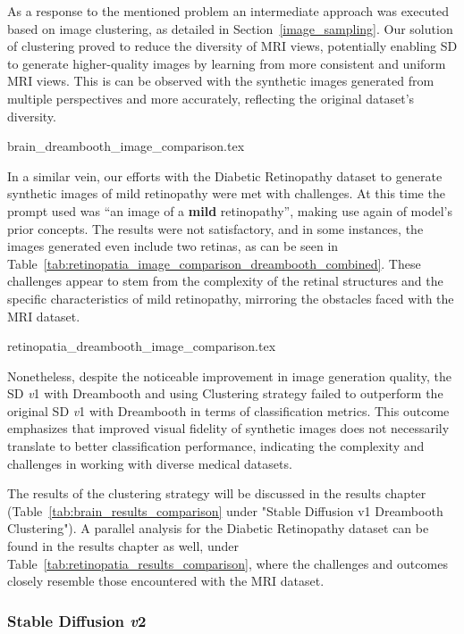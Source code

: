As a response to the mentioned problem an intermediate approach was executed based on image clustering, as detailed in Section~\ref{image_sampling}. Our solution of clustering proved to reduce the diversity of MRI views, potentially enabling SD to generate higher-quality images by learning from more consistent and uniform MRI views. This is can be observed with the synthetic images generated from multiple perspectives and more accurately, reflecting the original dataset's diversity.

{brain_dreambooth_image_comparison.tex}

In a similar vein, our efforts with the Diabetic Retinopathy dataset to generate synthetic images of mild retinopathy were met with challenges. At this time the prompt used was ``an image of a \textbf{mild} retinopathy'', making use again of model's prior concepts. The results were not satisfactory, and in some instances, the images generated even include two retinas, as can be seen in Table~\ref{tab:retinopatia_image_comparison_dreambooth_combined}. These challenges appear to stem from the complexity of the retinal structures and the specific characteristics of mild retinopathy, mirroring the obstacles faced with the MRI dataset.

{retinopatia_dreambooth_image_comparison.tex}

Nonetheless, despite the noticeable improvement in image generation quality, the SD \textit{v}1 with Dreambooth and using Clustering strategy failed to outperform the original SD \textit{v}1 with Dreambooth in terms of classification metrics. This outcome emphasizes that improved visual fidelity of synthetic images does not necessarily translate to better classification performance, indicating the complexity and challenges in working with diverse medical datasets.

The results of the clustering strategy will be discussed in the results chapter (Table~\ref{tab:brain_results_comparison} under "Stable Diffusion v1 Dreambooth Clustering"). A parallel analysis for the Diabetic Retinopathy dataset can be found in the results chapter as well, under Table~\ref{tab:retinopatia_results_comparison}, where the challenges and outcomes closely resemble those encountered with the MRI dataset.

\subsubsection{Stable Diffusion \textit{v}2}

